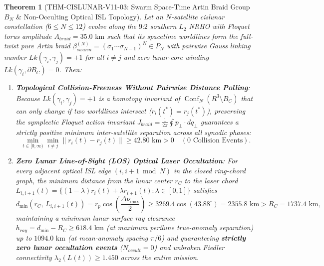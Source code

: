 \documentclass[11pt,a4paper,reqno]{article}
\def\bm#1{#1}%
\def\texttt#1{#1}%
\def\mathrm#1{#1}%
\def\mathcal#1{#1}%
\def\mathbb#1{#1}%
\theoremstyle{plain}
\newtheorem{theorem}{Theorem}[section]
\theoremstyle{definition}
\theoremstyle{remark}
\numberwithin{equation}{section}
\begin{document}
\begin{theorem}[\texttt{THM-CISLUNAR-V11-03}: Swarm Space-Time Artin Braid Group $\mathcal{B}_N$ \& Non-Occulting Optical ISL Topology]
\label{thm:cislunar_v11_artin_braid}
Let an $N$-satellite cislunar constellation ($6 \le N \le 12$) evolve along the $9\text{:}2$ southern $L_2$ NRHO with Floquet torus amplitude $A_{\mathrm{braid}} = 35.0\text{ km}$ such that its spacetime worldlines form the full-twist pure Artin braid $\beta_{\mathrm{swarm}}^{(N)} = (\sigma_1 \cdots \sigma_{N-1})^N \in \mathcal{P}_N$ with pairwise Gauss linking number $\mathrm{Lk}(\bm{\gamma}_i, \bm{\gamma}_j) = +1$ for all $i \neq j$ and zero lunar-core winding $\mathrm{Lk}(\bm{\gamma}_i, \partial\mathcal{B}_{\mathbb{C}}) = 0$. Then:
\begin{enumerate}[label=(\roman*),leftmargin=2.2em,itemsep=2pt]
  \item \textbf{Topological Collision-Freeness Without Pairwise Distance Polling}: Because $\mathrm{Lk}(\bm{\gamma}_i, \bm{\gamma}_j) = +1$ is a homotopy invariant of $\operatorname{Conf}_N(\mathbb{R}^3 \setminus \mathcal{B}_{\mathbb{C}})$ that can only change if two worldlines intersect ($\bm{r}_i(t^*) = \bm{r}_j(t^*)$), preserving the symplectic Floquet action invariant $J_{\mathrm{braid}} = \frac{1}{2\pi}\oint \bm{p}_{\perp}\cdot\mathrm{d}\bm{q}_{\perp}$ guarantees a strictly positive minimum inter-satellite separation across all synodic phases:
  \begin{equation}
    \min_{t \in [0, \infty)} \min_{i \neq j} \|\bm{r}_i(t) - \bm{r}_j(t)\| \ge \bm{42.80\text{ km}} > 0 \quad (\bm{0}\text{ Collision Events}).
    \label{eq:artin_braid_min_dist}
  \end{equation}
  \item \textbf{Zero Lunar Line-of-Sight (LOS) Optical Laser Occultation}: For every adjacent optical ISL edge $(i, i+1 \bmod N)$ in the closed ring-chord graph, the minimum distance from the lunar center $\bm{r}_{\mathbb{C}}$ to the laser chord $\mathcal{L}_{i,i+1}(t) = \{ (1-\lambda)\bm{r}_i(t) + \lambda\bm{r}_{i+1}(t) : \lambda \in [0,1] \}$ satisfies
  \begin{equation}
    d_{\min}\!\left(\bm{r}_{\mathbb{C}},\, \mathcal{L}_{i,i+1}(t)\right) = r_p \cos\!\left(\frac{\Delta\nu_{\max}}{2}\right) \ge 3269.4 \cos(43.88^\circ) = 2355.8\text{ km} > R_{\mathbb{C}} = 1737.4\text{ km},
    \label{eq:artin_braid_non_occultation}
  \end{equation}
  maintaining a minimum lunar surface ray clearance $h_{\mathrm{ray}} = d_{\min} - R_{\mathbb{C}} \ge \bm{618.4\text{ km}}$ (at maximum perilune true-anomaly separation) up to $1094.0\text{ km}$ (at mean-anomaly spacing $\pi/6$) and guaranteeing \textbf{strictly zero lunar occultation events} ($N_{\mathrm{occult}} = 0$) and unbroken Fiedler connectivity $\lambda_2(\bm{L}(t)) \ge 1.450$ across the entire mission.
\end{enumerate}
\end{theorem}
\end{document}
